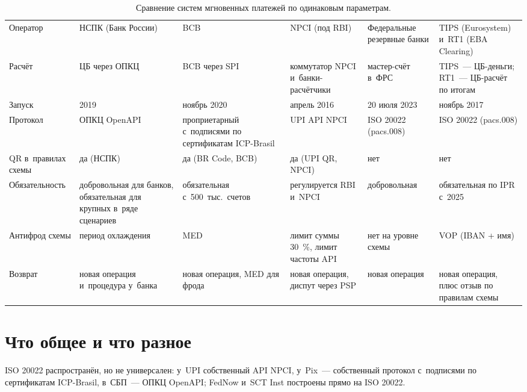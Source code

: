 \begin{table}[H]
  \begingroup
  \scriptsize
  \setlength{\tabcolsep}{3pt}
  \renewcommand{\arraystretch}{1.2}
  \begin{tabularx}{\textwidth}{
      @{}B{0.16\textwidth}
      P{0.155\textwidth}
      P{0.155\textwidth}
      P{0.155\textwidth}
      P{0.155\textwidth}
      P{0.155\textwidth}@{}
    }
    \toprule
    \headrow
    \thd{\thd{}}
    &  &  &  &  &  \\
    \midrule
    Оператор & НСПК (Банк России) & BCB & NPCI (под RBI) & Федеральные резервные банки & TIPS (Eurosystem) и~RT1 (EBA Clearing) \\
    Расчёт & ЦБ через ОПКЦ & BCB через SPI & коммутатор NPCI и~банки-расчётчики & мастер-счёт в~ФРС & TIPS~--- ЦБ-деньги; RT1~--- ЦБ-расчёт по итогам \\
    Запуск & 2019 & ноябрь 2020 & апрель 2016 & 20 июля 2023 & ноябрь 2017 \\
    Протокол & ОПКЦ OpenAPI & проприетарный с~подписями по сертификатам ICP-Brasil & UPI API NPCI & ISO 20022 (pacs.008) & ISO 20022 (pacs.008) \\
    QR в~правилах схемы & да (НСПК) & да (BR Code, BCB) & да (UPI QR, NPCI) & нет & нет \\
    Обязательность & добровольная для банков, обязательная для крупных в~ряде сценариев & обязательная с~500~тыс.\ счетов & регулируется RBI и~NPCI & добровольная & обязательная по IPR с~2025 \\
    Антифрод схемы & период охлаждения & MED & лимит суммы 30~\%, лимит частоты API & нет на уровне схемы & VOP (IBAN + имя) \\
    Возврат & новая операция и~процедура у~банка & новая операция, MED для фрода & новая операция, диспут через PSP & новая операция & новая операция, плюс отзыв по правилам схемы \\
    \bottomrule
  \end{tabularx}%
  \endgroup
  \caption{Сравнение систем мгновенных платежей по одинаковым параметрам.}\label{tab:instant-comparison}
\end{table}

\section{Что общее и что разное}\label{sec:instant-lessons}

ISO 20022 распространён, но не универсален: у~UPI собственный API
NPCI, у~Pix~--- собственный протокол с~подписями по сертификатам
ICP-Brasil, в~СБП~--- ОПКЦ OpenAPI; FedNow и~SCT Inst построены прямо
на ISO 20022.

